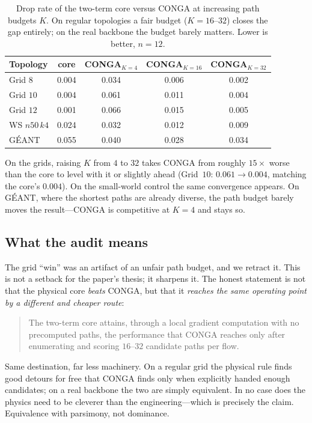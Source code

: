 \begin{table}[t]
\centering
\caption{Drop rate of the two-term core versus CONGA at increasing path
budgets $K$. On regular topologies a fair budget ($K=16$--$32$) closes the gap
entirely; on the real backbone the budget barely matters. Lower is better,
$n=12$.}
\label{tab:fair}
\small
\begin{tabular}{lcccc}
\toprule
Topology & core & CONGA$_{K=4}$ & CONGA$_{K=16}$ & CONGA$_{K=32}$ \\
\midrule
Grid $8$    & 0.004 & 0.034 & 0.006 & 0.002 \\
Grid $10$   & 0.004 & 0.061 & 0.011 & 0.004 \\
Grid $12$   & 0.001 & 0.066 & 0.015 & 0.005 \\
WS $n50\,k4$ & 0.024 & 0.032 & 0.012 & 0.009 \\
G\'EANT     & 0.055 & 0.040 & 0.028 & 0.034 \\
\bottomrule
\end{tabular}
\end{table}

On the grids, raising $K$ from $4$ to $32$ takes CONGA from roughly $15\times$
worse than the core to level with it or slightly ahead (Grid~$10$:
$0.061 \to 0.004$, matching the core's $0.004$). On the small-world control
the same convergence appears. On G\'EANT, where the shortest paths are already
diverse, the path budget barely moves the result---CONGA is competitive at
$K=4$ and stays so.

\subsection{What the audit means}

The grid ``win'' was an artifact of an unfair path budget, and we retract it.
This is not a setback for the paper's thesis; it sharpens it. The honest
statement is not that the physical core \emph{beats} CONGA, but that it
\emph{reaches the same operating point by a different and cheaper route}:

\begin{quote}
The two-term core attains, through a local gradient computation with no
precomputed paths, the performance that CONGA reaches only after enumerating
and scoring $16$--$32$ candidate paths per flow.
\end{quote}

Same destination, far less machinery. On a regular grid the physical rule
finds good detours for free that CONGA finds only when explicitly handed
enough candidates; on a real backbone the two are simply equivalent. In no
case does the physics need to be cleverer than the engineering---which is
precisely the claim. Equivalence with parsimony, not dominance.


